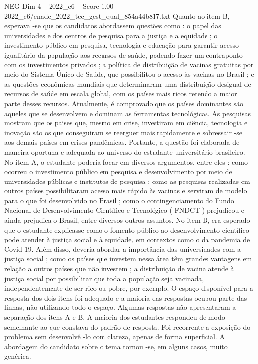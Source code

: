 \begin{textsample}{NEG Dim 4 – 2022\_c6 – Score 1.00 – 2022\_c6/enade\_2022\_tec\_gest\_qual\_854a44b817.txt}
Quanto ao item B, esperava -se que os candidatos abordassem questões como : o papel das universidades e dos centros de pesquisa para a justiça e a equidade ; o investimento público em pesquisa, tecnologia e educação para garantir acesso igualitário da população aos recursos de saúde, podendo fazer um contraponto com os investimentos privados ; a política de distribuição de vacinas gratuitas por meio do Sistema Único de Saúde, que possibilitou o acesso às vacinas no Brasil ; e as questões econômicas mundiais que determinaram uma distribuição desigual de recursos de saúde em escala global, com os países mais ricos retendo a maior parte desses recursos.
Atualmente, é comprovado que os países dominantes são aqueles que se desenvolvem e dominam as ferramentas tecnológicas.
As pesquisas mostram que os países que, mesmo em crise, investiram em ciência, tecnologia e inovação são os que conseguiram se reerguer mais rapidamente e sobressair -se aos demais países em crises pandêmicas.
Portanto, a questão foi elaborada de maneira oportuna e adequada ao universo do estudante universitário brasileiro.
No item A, o estudante poderia focar em diversos argumentos, entre eles : como ocorreu o investimento público em pesquisa e desenvolvimento por meio de universidades públicas e institutos de pesquisa ; como as pesquisas realizadas em outros países possibilitaram acesso mais rápido às vacinas e serviram de modelo para o que foi desenvolvido no Brasil ; como o contingenciamento do Fundo Nacional de Desenvolvimento Científico e Tecnológico ( FNDCT ) prejudicou e ainda prejudica o Brasil, entre diversos outros assuntos.
No item B, era esperado que o estudante explicasse como o fomento público ao desenvolvimento científico pode atender à justiça social e à equidade, em contextos como o da pandemia de Covid-19.
Além disso, deveria abordar a importância das universidades com a justiça social ; como os países que investem nessa área têm grandes vantagens em relação a outros países que não investem ; a distribuição de vacina atende à justiça social por possibilitar que toda a população seja vacinada, independentemente de ser rico ou pobre, por exemplo.
O espaço disponível para a resposta dos dois itens foi adequado e a maioria das respostas ocupou parte das linhas, não utilizando todo o espaço.
Algumas respostas não apresentaram a separação dos itens A e B.
A maioria dos estudantes respondeu de modo semelhante ao que constava do padrão de resposta.
Foi recorrente a exposição do problema sem desenvolvê -lo com clareza, apenas de forma superficial.
A abordagem do candidato sobre o tema tornou -se, em alguns casos, muito genérica.

\end{textsample}
